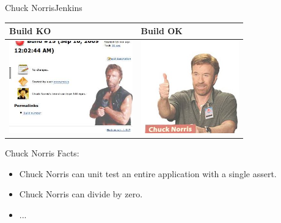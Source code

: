 \documentclass[9pt]{beamer}
\begin{document}
\begin{frame}{Chuck Norris}{Jenkins}
  \begin{center}
    \begin{tabular}{ l |l }
      Build KO & Build OK \\ \hline
        \includegraphics[height=4cm]{images/chuck_full} &
      \includegraphics[height=4cm]{images/chuck_happy}
      \\
    \end{tabular}
  \end{center}
  Chuck Norris Facts:
  \begin{itemize}
    \item Chuck Norris can unit test an entire application with a single assert.
    \item Chuck Norris can divide by zero.
    \item ...
  \end{itemize}
\end{frame}
\end{document}
